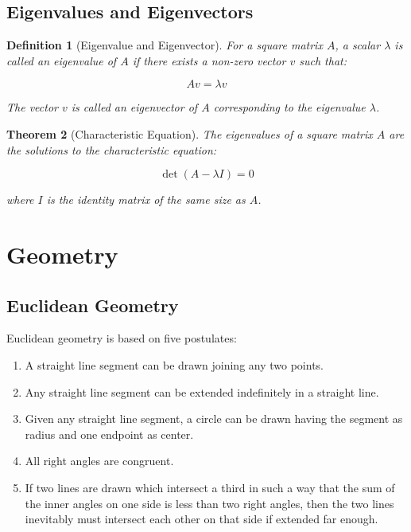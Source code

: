 \documentclass[12pt]{article}
\newif\ifDarkMode
\newcommand{\eqcolor}[1]{\ifDarkMode\textcolor{draculaPurple}{#1}\else#1\fi}
\newcommand{\varcolor}[1]{\ifDarkMode\textcolor{draculaGreen}{#1}\else#1\fi}
\newtheorem{theorem}{Theorem}[section]
\newtheorem{definition}[theorem]{Definition}
\begin{document}
\subsection{\textcolor{draculaYellow}{Eigenvalues and Eigenvectors}}

\begin{definition}[Eigenvalue and Eigenvector]
For a square matrix $\varcolor{A}$, a scalar $\varcolor{\lambda}$ is called an eigenvalue of $\varcolor{A}$ if there exists a non-zero vector $\varcolor{v}$ such that:

\[
\eqcolor{Av = \lambda v}
\]

The vector $\varcolor{v}$ is called an eigenvector of $\varcolor{A}$ corresponding to the eigenvalue $\varcolor{\lambda}$.
\end{definition}

\begin{theorem}[Characteristic Equation]
The eigenvalues of a square matrix $\varcolor{A}$ are the solutions to the characteristic equation:

\[
\eqcolor{\det(A - \lambda I) = 0}
\]

where $\varcolor{I}$ is the identity matrix of the same size as $\varcolor{A}$.
\end{theorem}

\section{\textcolor{draculaCyan}{Geometry}}

\subsection{\textcolor{draculaYellow}{Euclidean Geometry}}

Euclidean geometry is based on five postulates:

\begin{enumerate}
    \item A straight line segment can be drawn joining any two points.
    \item Any straight line segment can be extended indefinitely in a straight line.
    \item Given any straight line segment, a circle can be drawn having the segment as radius and one endpoint as center.
    \item All right angles are congruent.
    \item If two lines are drawn which intersect a third in such a way that the sum of the inner angles on one side is less than two right angles, then the two lines inevitably must intersect each other on that side if extended far enough.
\end{enumerate}
\end{document}
